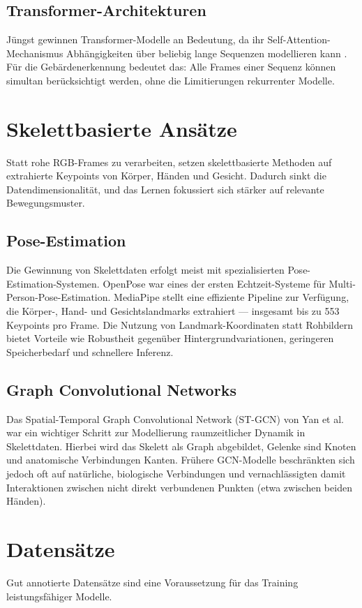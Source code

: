 \subsection{Transformer-Architekturen}
Jüngst gewinnen Transformer-Modelle an Bedeutung, da ihr Self-Attention-Mechanismus Abhängigkeiten über beliebig lange Sequenzen modellieren kann \cite{vaswani2017}. Für die Gebärdenerkennung bedeutet das: Alle Frames einer Sequenz können simultan berücksichtigt werden, ohne die Limitierungen rekurrenter Modelle.

\section{Skelettbasierte Ansätze}
Statt rohe RGB-Frames zu verarbeiten, setzen skelettbasierte Methoden auf extrahierte Keypoints von Körper, Händen und Gesicht. Dadurch sinkt die Datendimensionalität, und das Lernen fokussiert sich stärker auf relevante Bewegungsmuster.

\subsection{Pose-Estimation}
Die Gewinnung von Skelettdaten erfolgt meist mit spezialisierten Pose-Estimation-Systemen. OpenPose \cite{cao2019} war eines der ersten Echtzeit-Systeme für Multi-Person-Pose-Estimation. MediaPipe \cite{lugaresi2019} stellt eine effiziente Pipeline zur Verfügung, die Körper-, Hand- und Gesichtslandmarks extrahiert — insgesamt bis zu 553 Keypoints pro Frame. Die Nutzung von Landmark-Koordinaten statt Rohbildern bietet Vorteile wie Robustheit gegenüber Hintergrundvariationen, geringeren Speicherbedarf und schnellere Inferenz.

\subsection{Graph Convolutional Networks}
Das Spatial-Temporal Graph Convolutional Network (ST-GCN) von Yan et al. \cite{yan2018} war ein wichtiger Schritt zur Modellierung raumzeitlicher Dynamik in Skelettdaten. Hierbei wird das Skelett als Graph abgebildet, Gelenke sind Knoten und anatomische Verbindungen Kanten. Frühere GCN-Modelle beschränkten sich jedoch oft auf natürliche, biologische Verbindungen und vernachlässigten damit Interaktionen zwischen nicht direkt verbundenen Punkten (etwa zwischen beiden Händen).

\section{Datensätze}
Gut annotierte Datensätze sind eine Voraussetzung für das Training leistungsfähiger Modelle.

